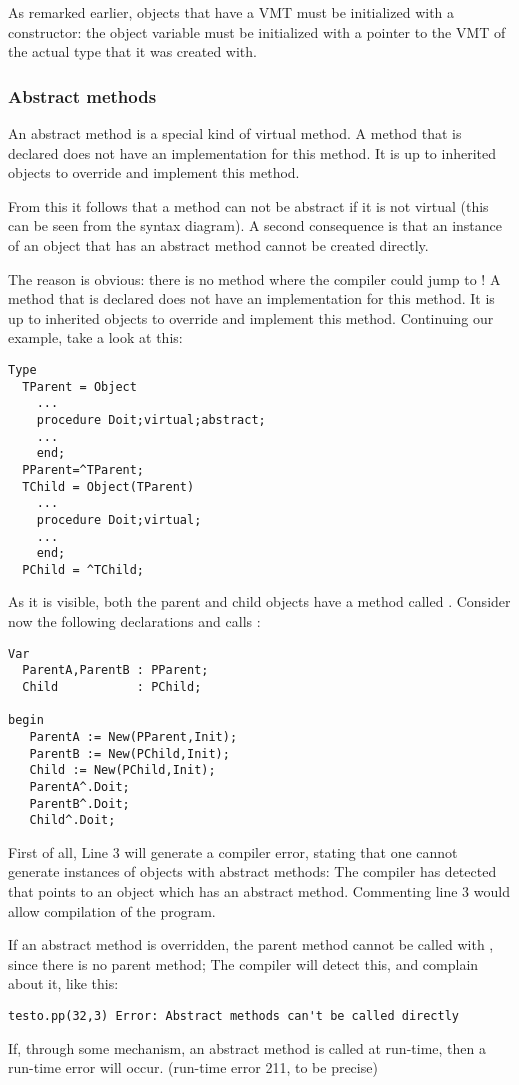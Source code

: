 As remarked earlier, objects that have a VMT must be initialized with a
constructor: the object variable must be initialized with a pointer to
the VMT of the actual type that it was created with.

%
\subsubsection{Abstract methods}
An abstract method is a special kind of virtual method. A method that is
declared  does not have an implementation for this method. 
It is up to inherited objects to override and implement this method.

From this it follows that a method can not be abstract if it is not virtual 
(this can be seen from the syntax diagram). A second consequence is that 
an instance of an object that has an abstract method cannot be created
directly.

The reason is obvious: there is no method where the compiler could jump to !
A method that is declared  does not have an implementation for
this method. It is up to inherited objects to override and implement this
method. Continuing our example, take a look at this:
\begin{verbatim}
Type
  TParent = Object
    ...
    procedure Doit;virtual;abstract;
    ...
    end;
  PParent=^TParent;
  TChild = Object(TParent)
    ...
    procedure Doit;virtual;
    ...
    end;
  PChild = ^TChild;
\end{verbatim}
As it is visible, both the parent and child objects have a method called
. Consider now the following declarations and calls :
\begin{verbatim}
Var 
  ParentA,ParentB : PParent;
  Child           : PChild;

begin
   ParentA := New(PParent,Init);
   ParentB := New(PChild,Init);
   Child := New(PChild,Init);
   ParentA^.Doit;
   ParentB^.Doit;
   Child^.Doit;
\end{verbatim}
First of all, Line 3 will generate a compiler error, stating that one cannot
generate instances of objects with abstract methods: The compiler has
detected that  points to an object which has an abstract
method. Commenting line 3 would allow compilation of the program.
\begin{remark}
If an abstract method is overridden, the parent method cannot be called
with , since there is no parent method; The compiler
will detect this, and complain about it, like this:
\begin{verbatim}
testo.pp(32,3) Error: Abstract methods can't be called directly
\end{verbatim}
If, through some mechanism, an abstract method is called at run-time,
then a run-time error will occur. (run-time error 211, to be precise)
\end{remark}

